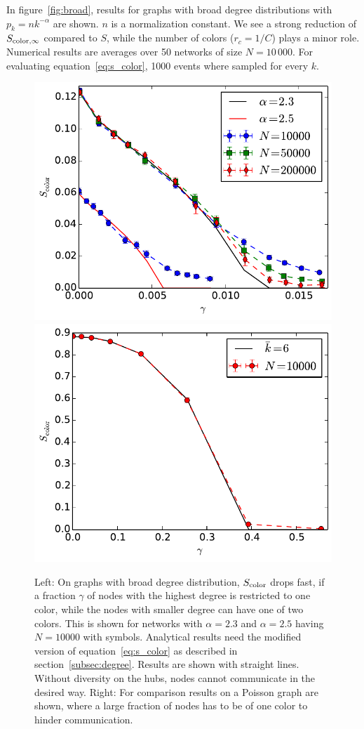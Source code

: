 \documentclass[aps, pre, onecolumn, a4paper, floatfix]{revtex4}
\begin{document}
In figure~\ref{fig:broad}, results for graphs with broad degree distributions with 
$p_k=n k^{-\alpha}$ are shown. $n$ is a normalization constant. We see a strong reduction of 
$S_{{\rm color},\infty}$ compared to $S$, while the number of colors ($r_c=1/C$) plays 
a minor role. Numerical results are averages over 50 networks of size $N=10\,000$. 
For evaluating equation~\ref{eq:s_color}, 1000 events where sampled for every $k$. 


\begin{figure}[htb]
\begin{center}
	\includegraphics[width=0.49\columnwidth]{S_color_degree_dependent_broad.pdf}
    \includegraphics[width=0.49\columnwidth]{S_color_degree_dependent_poisson.pdf}
	\caption{Left: On graphs with broad degree distribution, $S_{\rm color}$ drops fast, 
	if a fraction $\gamma$ of nodes with the highest 
	degree is restricted to one color, while the nodes with smaller degree can have one of 
	two colors. This is shown for networks with $\alpha=2.3$ and $\alpha=2.5$ having $N=10000$ 
	with symbols. Analytical results need the modified version of equation~\ref{eq:s_color} 
	as described in section~\ref{subsec:degree}. Results are shown with straight lines. Without diversity 
	on the hubs, nodes cannot communicate in the desired way. Right: For comparison results on a Poisson 
	graph are shown, where a large fraction of nodes has to be of one color to hinder communication.}
	\label{fig:degree}
\end{center}
\end{figure}
\end{document}
